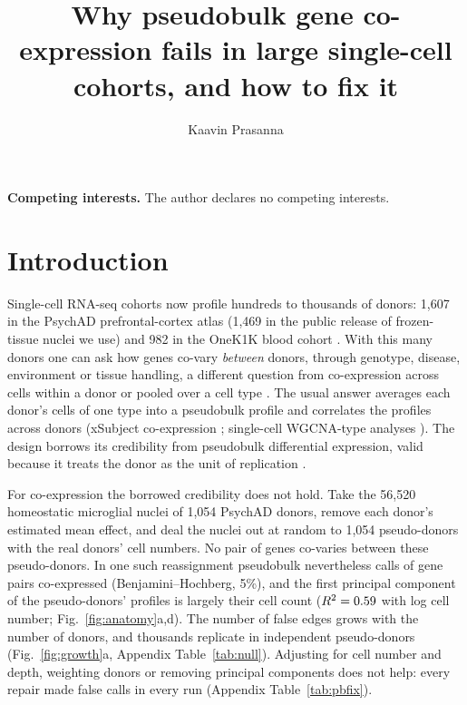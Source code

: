 \documentclass[10pt,letterpaper]{article}
\title{Why pseudobulk gene co-expression fails in large single-cell cohorts, and how to fix it}
\author{Kaavin Prasanna}
\date{}
\theoremstyle{definition}
\theoremstyle{remark}
\begin{document}
\maketitle
\thispagestyle{empty}

\begin{abstract}\normalsize

\end{abstract}
\vspace{1em}\noindent\textbf{Competing interests.} The author declares no competing interests.

\clearpage
{}

\section{Introduction}

Single-cell RNA-seq cohorts now profile hundreds to thousands of donors: 1,607 in the PsychAD prefrontal-cortex atlas \citep{Lee2026} (1,469 in the public release of frozen-tissue nuclei we use) and 982 in the OneK1K blood cohort \citep{Yazar2022}. With this many donors one can ask how genes co-vary \emph{between} donors, through genotype, disease, environment or tissue handling, a different question from co-expression across cells within a donor \citep{vanderWijst2018,Li2023coeQTL} or pooled over a cell type \citep{Su2023CSCORE,Skinnider2019,Kim2024memento,Lu2023Dozer}. The usual answer averages each donor's cells of one type into a pseudobulk profile and correlates the profiles across donors (xSubject co-expression \citep{Chu2024xSubject,Zhang2026scpcQTL}; single-cell WGCNA-type analyses \citep{Langfelder2008WGCNA,Morabito2023hdWGCNA}). The design borrows its credibility from pseudobulk differential expression, valid because it treats the donor as the unit of replication \citep{Squair2021,Murphy2022pseudobulk,Zimmerman2021,Crowell2020muscat}.

For co-expression the borrowed credibility does not hold. Take the 56{,}520 homeostatic microglial nuclei of 1{,}054 PsychAD donors, remove each donor's estimated mean effect, and deal the nuclei out at random to 1{,}054 pseudo-donors with the real donors' cell numbers. No pair of genes co-varies between these pseudo-donors. In one such reassignment pseudobulk nevertheless calls \RsixNullCalls{} of \RsixPairs{} gene pairs co-expressed (Benjamini--Hochberg, 5\%), and the first principal component of the pseudo-donors' profiles is largely their cell count ($R^2=0.59$ with log cell number; Fig.~\ref{fig:anatomy}a,d). The number of false edges grows with the number of donors, and thousands replicate in independent pseudo-donors (Fig.~\ref{fig:growth}a, Appendix Table~\ref{tab:null}). Adjusting for cell number and depth, weighting donors or removing principal components does not help: every repair made false calls in every run (Appendix Table~\ref{tab:pbfix}).
\end{document}
